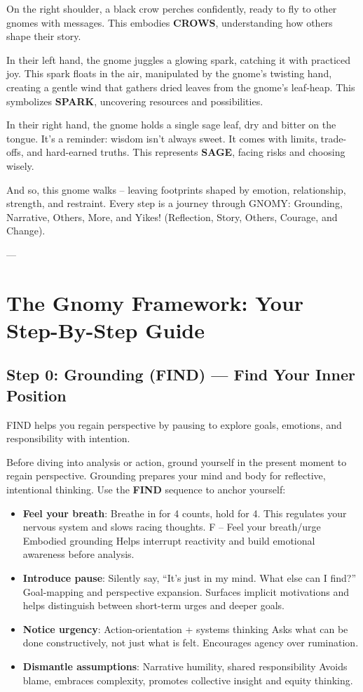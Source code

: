 \documentclass{article}
\begin{document}
On the right shoulder, a black crow perches confidently, ready to fly to other gnomes with messages. This embodies \textbf{CROWS}, understanding how others shape their story.

In their left hand, the gnome juggles a glowing spark, catching it with practiced joy. This spark floats in the air, manipulated by the gnome's twisting hand, creating a gentle wind that gathers dried leaves from the gnome's leaf-heap. This symbolizes \textbf{SPARK}, uncovering resources and possibilities.

In their right hand, the gnome holds a single sage leaf, dry and bitter on the tongue. It's a reminder: wisdom isn't always sweet. It comes with limits, trade-offs, and hard-earned truths. This represents \textbf{SAGE}, facing risks and choosing wisely.

And so, this gnome walks -- leaving footprints shaped by emotion, relationship, strength, and restraint. Every step is a journey through GNOMY: Grounding, Narrative, Others, More, and Yikes! (Reflection, Story, Others, Courage, and Change).

---

\section{The Gnomy Framework: Your Step-By-Step Guide}

\subsection{Step 0: Grounding (FIND) — Find Your Inner Position}
FIND helps you regain perspective by pausing to explore goals, emotions, and responsibility with intention.

Before diving into analysis or action, ground yourself in the present moment to regain perspective. Grounding prepares your mind and body for reflective, intentional thinking. Use the \textbf{FIND} sequence to anchor yourself:
\begin{itemize}[noitemsep,topsep=0pt]
    \item \textbf{Feel your breath}: Breathe in for 4 counts, hold for 4. This regulates your nervous system and slows racing thoughts. F – Feel your breath/urge	Embodied grounding	Helps interrupt reactivity and build emotional awareness before analysis.
    \item \textbf{Introduce pause}: Silently say, ``It's just in my mind. What else can I find?'' Goal-mapping and perspective expansion. Surfaces implicit motivations and helps distinguish between short-term urges and deeper goals.
    \item \textbf{Notice urgency}: Action-orientation + systems thinking	Asks what can be done constructively, not just what is felt. Encourages agency over rumination.
    \item \textbf{ Dismantle assumptions}: Narrative humility, shared responsibility	Avoids blame, embraces complexity, promotes collective insight and equity thinking.
\end{itemize}
\end{document}
